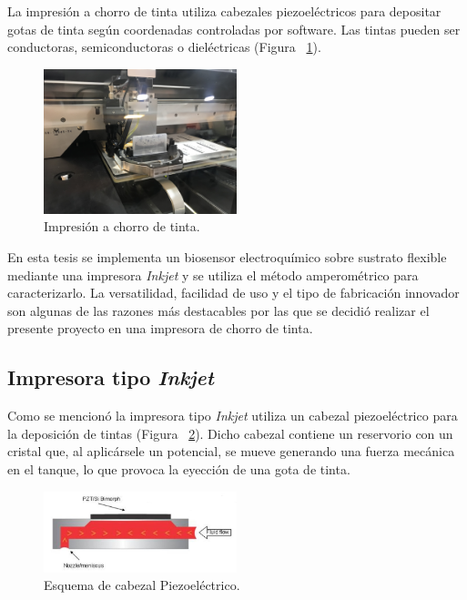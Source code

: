 La impresión a chorro de tinta utiliza cabezales piezoeléctricos para depositar gotas de tinta según coordenadas controladas por software. Las tintas pueden ser conductoras, semiconductoras o dieléctricas (Figura ~\ref{fig:Figura_inkjet_dimatix}).

\begin{figure}[H]
  \centering
    \includegraphics[width=0.5\textwidth]{Figuras/Figura_inkjet_dimatix}
  \caption{Impresión a chorro de tinta.}
  \label{fig:Figura_inkjet_dimatix}
\end{figure}


En esta tesis se implementa un biosensor electroquímico sobre sustrato flexible mediante una impresora \textit{Inkjet} y se utiliza el método amperométrico para caracterizarlo. La versatilidad, facilidad de uso y el tipo de fabricación innovador son algunas de las razones más destacables por las que se decidió realizar el presente proyecto en una impresora de chorro de tinta.

\subsection{Impresora tipo \textit{Inkjet}}
Como se mencionó la impresora tipo \textit{Inkjet} utiliza un cabezal piezoeléctrico para la deposición de tintas (Figura ~\ref{fig:Figura_Piezoelectrico}). Dicho cabezal contiene un reservorio con un cristal que, al aplicársele un potencial, se mueve generando una fuerza mecánica en el tanque, lo que provoca la eyección de una gota de tinta.

\begin{figure}[H]
  \centering
    \includegraphics[width=0.5\textwidth]{Figuras/Figura_Piezoelectrico}
  \caption{Esquema de cabezal Piezoeléctrico.}
  \label{fig:Figura_Piezoelectrico}
\end{figure}

